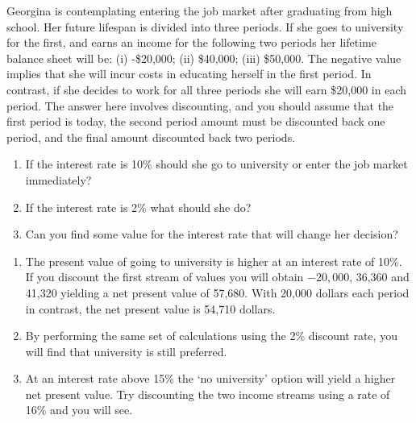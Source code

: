 \begin{enumialphparenastyle}
\begin{ex}\label{ex:ch13ex4}
Georgina is contemplating entering the job market after graduating from high school. Her future lifespan is divided into three periods. If she goes to university for the first, and earns an income for the following two periods her lifetime balance sheet will be: (i) -\$20,000; (ii) \$40,000; (iii) \$50,000. The negative value implies that she will incur costs in educating herself in the first period. In contrast, if she decides to work for all three periods she will earn \$20,000 in each period. The answer here involves discounting, and you should assume that the first period is today, the second period amount must be discounted back one period, and the final amount discounted back two periods.
\begin{enumerate}
	\item	If the interest rate is 10\% should she go to university or enter the job market immediately?
	\item	If the interest rate is 2\% what should she do?
	\item	Can you find some value for the interest rate that will change her decision?
\end{enumerate}
\begin{sol}
\begin{enumerate}
	\item	The present value of going to university is higher at an interest rate of 10\%. If you discount the first stream of values you will obtain $-20,000$, 36,360 and 41,320 yielding a net present value of 57,680. With 20,000 dollars each period in contrast, the net present value is 54,710 dollars.
	\item	By performing the same set of calculations using the 2\% discount rate, you will find that university is still preferred.
	\item	At an interest rate above 15\% the `no university' option will yield a higher net present value. Try discounting the two income streams using a rate of 16\% and you will see.
\end{enumerate}
\end{sol}
\end{ex}


\end{enumialphparenastyle}
